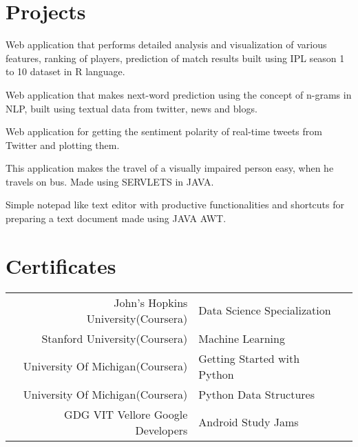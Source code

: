 \documentclass[]{deedy-resume-openfont}
\begin{document}
\begin{minipage}[t]{0.66\textwidth}

\section{Projects}
{\justifying \noindent Web application that performs detailed analysis and visualization of various features, ranking of players, prediction of match results built using IPL season 1 to 10 dataset in R language. \par}
\sectionsep

{\justifying \noindent Web application that makes next-word prediction using the concept of n-grams in NLP, built using textual data from twitter, news and blogs. \par}
\sectionsep

{\justifying \noindent Web application for getting the sentiment polarity of real-time tweets from Twitter and plotting them.
\sectionsep \par}

{\justifying \noindent This application makes the travel of a visually impaired person easy, when he travels on bus. Made using SERVLETS in JAVA. \par}
\sectionsep

{\justifying \noindent Simple notepad like text editor with productive functionalities and shortcuts for preparing a text document made using JAVA AWT. \par}
\sectionsep


\section{Certificates} 

\begin{tabular}{rll}
John’s Hopkins University(Coursera) & Data Science Specialization\\
Stanford University(Coursera) & Machine Learning\\
University Of Michigan(Coursera) & Getting Started with Python\\
University Of Michigan(Coursera) & Python Data Structures\\
GDG VIT Vellore Google Developers & Android Study Jams
\end{tabular}
\sectionsep


\end{minipage}
\end{document}

